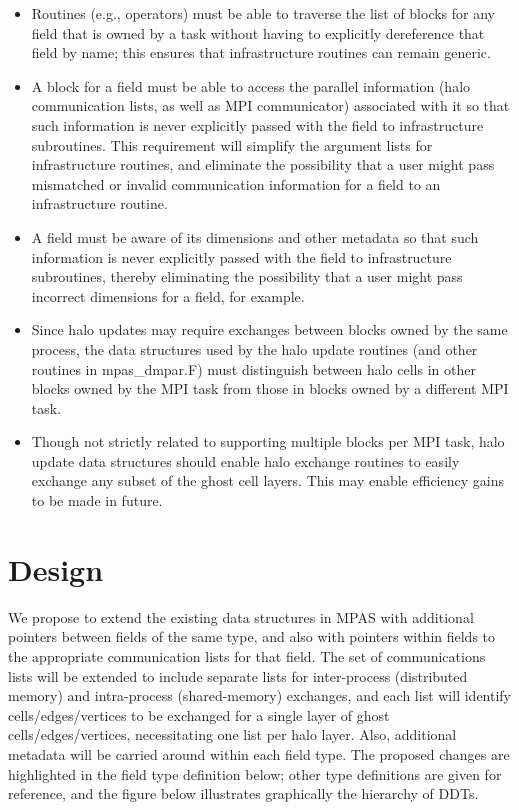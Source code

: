 \documentclass[11pt]{report}
\begin{document}
\begin{itemize}

\item Routines (e.g., operators) must be able to traverse the list of blocks for any field that is owned by a task without having
to explicitly dereference that field by name; this ensures that infrastructure routines can remain generic.

\item A block for a field must be able to access the parallel information (halo communication lists, as well as
MPI communicator) associated with it so that such information is never explicitly passed with the field
to infrastructure subroutines. This requirement will simplify the argument lists for infrastructure routines, and 
eliminate the possibility that a user might pass mismatched or invalid communication information for a field
to an infrastructure routine.

\item A field must be aware of its dimensions and other metadata so that such information is never explicitly 
passed with the field to infrastructure subroutines, thereby eliminating the possibility that a user might pass incorrect dimensions
for a field, for example.

\item Since halo updates may require exchanges between blocks owned by the same process, the data
structures used by the halo update routines (and other routines in mpas\_dmpar.F) must distinguish between
halo cells in other blocks owned by the MPI task from those in blocks owned by a different MPI task.

\item Though not strictly related to supporting multiple blocks per MPI task, halo update data structures should
enable halo exchange routines to easily exchange any subset of the ghost cell layers. This may enable efficiency
gains to be made in future.

\end{itemize}



%
%
\chapter{Design}

We propose to extend the existing data structures in MPAS with additional pointers
between fields of the same type, and also with pointers within fields to the appropriate communication
lists for that field. The set of communications lists will be extended to include separate lists for inter-process
(distributed memory) and intra-process (shared-memory) exchanges, and each list will identify cells/edges/vertices
to be exchanged for a single layer of ghost cells/edges/vertices, necessitating one list per halo layer. Also, additional metadata 
will be carried around within each field type. The proposed changes 
are highlighted in the field type definition below; other type definitions are given for reference, and the figure below 
illustrates graphically the hierarchy of DDTs.
\end{document}
